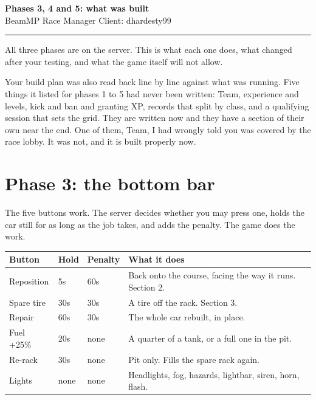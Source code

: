 \documentclass[11pt,a4paper]{article}
\begin{document}
\begin{center}
{\LARGE\bfseries Phases 3, 4 and 5: what was built}\\[4pt]
{\small BeamMP Race Manager \quad Client: dhardesty99}
\end{center}

\vspace{4pt}
\hrule
\vspace{8pt}

All three phases are on the server. This is what each one does, what changed
after your testing, and what the game itself will not allow.

Your build plan was also read back line by line against what was running. Five
things it listed for phases 1 to 5 had never been written: Team, experience and
levels, kick and ban and granting XP, records that split by class, and a
qualifying session that sets the grid. They are written now and they have a
section of their own near the end. One of them, Team, I had wrongly told you
was covered by the race lobby. It was not, and it is built properly now.

\section{Phase 3: the bottom bar}

The five buttons work. The server decides whether you may press one, holds the
car still for as long as the job takes, and adds the penalty. The game does the
work.

\begin{longtable}{@{}p{24mm}p{12mm}p{16mm}>{\raggedright\arraybackslash}p{70mm}@{}}
\toprule
\textbf{Button} & \textbf{Hold} & \textbf{Penalty} & \textbf{What it does} \\
\midrule
\endhead
Reposition & 5s & 60s  & Back onto the course, facing the way it runs. Section 2. \\
Spare tire & 30s & 30s & A tire off the rack. Section 3. \\
Repair     & 60s & 30s & The whole car rebuilt, in place. \\
Fuel +25\% & 20s & none & A quarter of a tank, or a full one in the pit. \\
Re-rack    & 30s & none & Pit only. Fills the spare rack again. \\
Lights     & none & none & Headlights, fog, hazards, lightbar, siren, horn, flash. \\
\bottomrule
\end{longtable}
\end{document}
